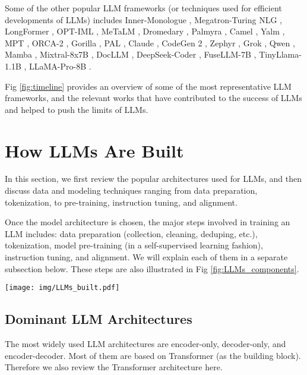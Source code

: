 \documentclass[conference]{IEEEtran}
\begin{document}
Some of the other popular LLM frameworks (or techniques used for efficient developments of LLMs) includes 
Inner-Monologue \cite{huang2022inner},  
Megatron-Turing NLG \cite{smith2022using},  
LongFormer \cite{beltagy2020longformer},
OPT-IML \cite{iyer2022opt}, 
MeTaLM  \cite{hao2022language},
Dromedary \cite{sun2023principle}, 
Palmyra \cite{Palmyra}, 
Camel \cite{Camel}, 
Yalm \cite{yalm}, 
MPT \cite{team2023introducing},
ORCA-2 \cite{mitra2023orca},
Gorilla \cite{patil2023gorilla}, 
PAL \cite{gao2023pal}, 
Claude \cite{claude},
CodeGen 2 \cite{nijkamp2023codegen2},
Zephyr \cite{tunstall2023zephyr}, 
Grok \cite{Grok},  
Qwen \cite{bai2023qwen}, 
Mamba \cite{gu2023mamba}, 
Mixtral-8x7B \cite{mixtral},
DocLLM \cite{wang2023docllm},
DeepSeek-Coder \cite{guo2024deepseekcoder},
FuseLLM-7B \cite{wan2024knowledge},
TinyLlama-1.1B \cite{zhang2024tinyllama},
LLaMA-Pro-8B \cite{wu2024llama}.

Fig \ref{fig:timeline} provides an overview of some of the most representative LLM frameworks, and the relevant works that have contributed to the success of LLMs and helped to push the limits of LLMs.





\section{How LLMs Are Built}
\label{sec:LLM_built}
In this section, we first review the popular architectures used for LLMs, and then discuss data and modeling techniques ranging from data preparation, tokenization, to pre-training, instruction tuning, and alignment.

Once the model architecture is chosen, the major steps involved in training an LLM includes: data preparation (collection, cleaning, deduping, etc.), tokenization, model pre-training (in a self-supervised learning fashion), instruction tuning, and alignment. 
We will explain each of them in a separate subsection below. 
These steps are also illustrated in Fig \ref{fig:LLMs_components}.




\begin{figure*}
    \centering
    \texttt{[image: img/LLMs\_built.pdf]}
    \caption{This figure shows different components of LLMs.}
    \label{fig:LLMs_components}
\end{figure*}


\subsection{Dominant LLM Architectures}
The most widely used LLM architectures are encoder-only, decoder-only, and encoder-decoder. Most of them are based on Transformer (as the building block). Therefore we also review the Transformer architecture here.
\end{document}
